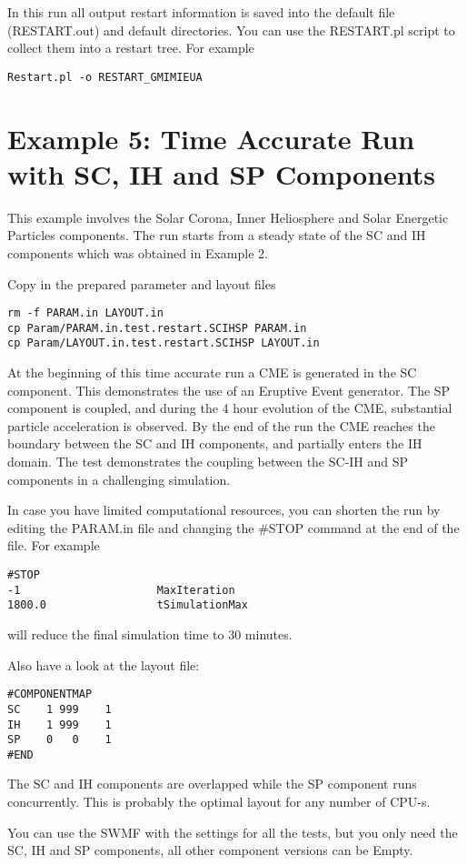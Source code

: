 In this run all output restart information is saved into the
default file (RESTART.out) and default directories.
You can use the RESTART.pl script to collect them into a restart tree.
For example
\begin{verbatim}
Restart.pl -o RESTART_GMIMIEUA
\end{verbatim}

\section{Example 5: Time Accurate Run with SC, IH and SP Components}

This example involves the Solar Corona, Inner Heliosphere
and Solar Energetic Particles components.
The run starts from a steady state of the SC and IH components
which was obtained in Example 2.

Copy in the prepared parameter and layout files
\begin{verbatim}
rm -f PARAM.in LAYOUT.in
cp Param/PARAM.in.test.restart.SCIHSP PARAM.in
cp Param/LAYOUT.in.test.restart.SCIHSP LAYOUT.in
\end{verbatim}
At the beginning of this time accurate run a CME is 
generated in the SC component. This demonstrates the
use of an Eruptive Event generator.
The SP component is coupled, and during the 4 hour evolution
of the CME, substantial particle acceleration is observed. 
By the end of the run the CME reaches the boundary 
between the SC and IH components, and partially enters the IH domain.
The test demonstrates the coupling between the SC-IH and SP
components in a challenging simulation.

In case you have limited computational resources, you can 
shorten the run by editing the PARAM.in file and changing
the \#STOP command at the end of the file. For example 
\begin{verbatim}
#STOP
-1                     MaxIteration
1800.0                 tSimulationMax
\end{verbatim}
will reduce the final simulation time to 30 minutes.

Also have a look at the layout file:
\begin{verbatim}
#COMPONENTMAP
SC    1 999    1
IH    1 999    1
SP    0   0    1 
#END
\end{verbatim}
The SC and IH components are overlapped while the SP component
runs concurrently. This is probably the optimal layout for any
number of CPU-s.

You can use the SWMF with the settings for all the tests, 
but you only need the SC, IH and SP components,
all other component versions can be Empty.

